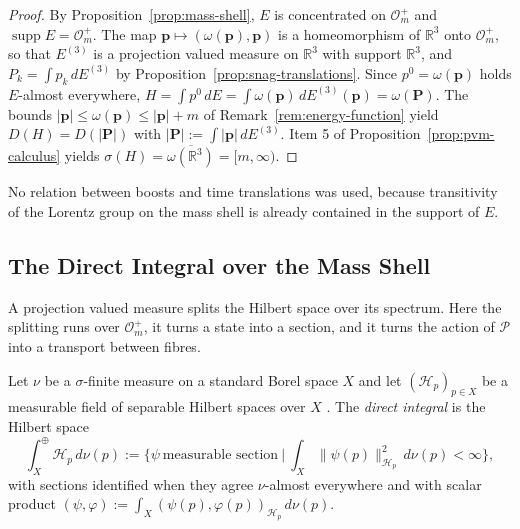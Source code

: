 \begin{proof}
	By Proposition~\ref{prop:mass-shell}, $E$ is concentrated on $\mathcal{O}_m^+$ and $\operatorname{supp}E=\mathcal{O}_m^+$. The map $\mathbf{p}\mapsto(\omega(\mathbf{p}),\mathbf{p})$ is a homeomorphism of $\mathbb{R}^3$ onto $\mathcal{O}_m^+$, so that $E^{(3)}$ is a projection valued measure on $\mathbb{R}^3$ with support $\mathbb{R}^3$, and $P_k=\int p_k\,dE^{(3)}$ by Proposition~\ref{prop:snag-translations}. Since $p^0=\omega(\mathbf{p})$ holds $E$-almost everywhere, $H=\int p^0\,dE=\int\omega(\mathbf{p})\,dE^{(3)}(\mathbf{p})=\omega(\mathbf{P})$. The bounds $|\mathbf{p}|\leq\omega(\mathbf{p})\leq|\mathbf{p}|+m$ of Remark~\ref{rem:energy-function} yield $D(H)=D(|\mathbf{P}|)$ with $|\mathbf{P}|:=\int|\mathbf{p}|\,dE^{(3)}$. Item 5 of Proposition~\ref{prop:pvm-calculus} yields $\sigma(H)=\overline{\omega(\mathbb{R}^3)}=[m,\infty)$.
\end{proof}

\noindent No relation between boosts and time translations was used, because transitivity of the Lorentz group on the mass shell is already contained in the support of $E$.

\subsection{The Direct Integral over the Mass Shell}
\label{subsec:direct-integral}

A projection valued measure splits the Hilbert space over its spectrum. Here the splitting runs over $\mathcal{O}_m^+$, it turns a state into a section, and it turns the action of $\mathcal{P}$ into a transport between fibres.

\begin{definition}\label{def:direct-integral}
	Let $\nu$ be a $\sigma$-finite measure on a standard Borel space $X$ and let $(\mathcal{H}_p)_{p\in X}$ be a measurable field of separable Hilbert spaces over $X$ \cite[TODO-location]{TODO-Dixmier}. The \emph{direct integral} is the Hilbert space
	\begin{equation*}
		\int^\oplus_X\mathcal{H}_p\,d\nu(p):=\Big\{\psi\ \text{measurable section}\ \Big|\ \int_X\|\psi(p)\|^2_{\mathcal{H}_p}\,d\nu(p)<\infty\Big\},
	\end{equation*}
	with sections identified when they agree $\nu$-almost everywhere and with scalar product $(\psi,\varphi):=\int_X(\psi(p),\varphi(p))_{\mathcal{H}_p}\,d\nu(p)$.
\end{definition}

